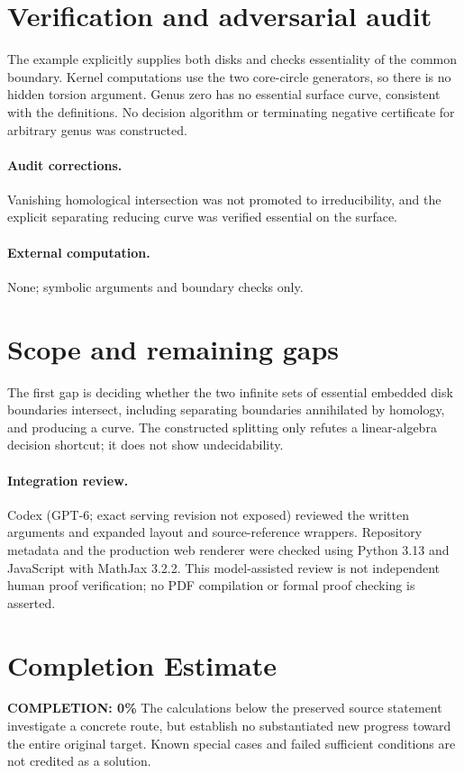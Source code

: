 \documentclass[11pt]{article}
\begin{document}
\section{Verification and adversarial audit}
The example explicitly supplies both disks and checks essentiality of the
common boundary. Kernel computations use the two core-circle generators, so
there is no hidden torsion argument. Genus zero has no essential surface curve,
consistent with the definitions. No decision algorithm or terminating negative
certificate for arbitrary genus was constructed.
\paragraph{Audit corrections.} Vanishing homological intersection was not promoted to irreducibility, and the explicit separating reducing curve was verified essential on the surface.
\paragraph{External computation.} None; symbolic arguments and boundary checks only.
\section{Scope and remaining gaps}
The first gap is deciding whether the two infinite sets of essential
embedded disk boundaries intersect, including separating boundaries annihilated
by homology, and producing a curve. The constructed splitting only refutes a
linear-algebra decision shortcut; it does not show undecidability.
\paragraph{Integration review.} Codex (GPT-6; exact serving revision not exposed) reviewed the written arguments and expanded layout and source-reference wrappers. Repository metadata and the production web renderer were checked using Python 3.13 and JavaScript with MathJax 3.2.2. This model-assisted review is not independent human proof verification; no PDF compilation or formal proof checking is asserted.

\section{Completion Estimate}
\noindent\textbf{COMPLETION: 0\%}
The calculations below the preserved source statement investigate a concrete route,
but establish no substantiated new progress toward the entire original target.
Known special cases and failed sufficient conditions are not credited as a solution.
\end{document}
